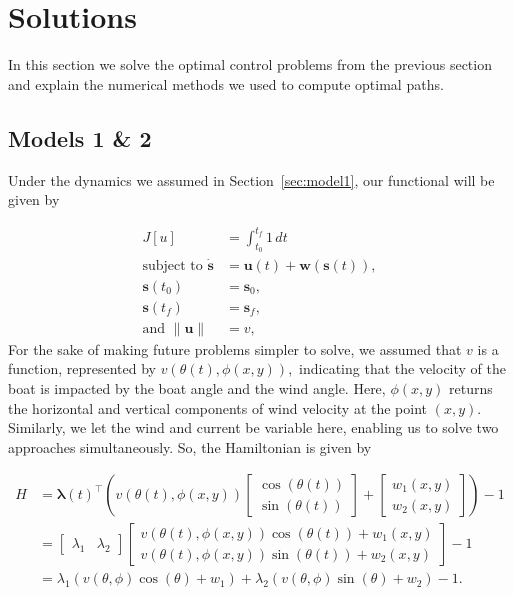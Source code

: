 \documentclass[11pt]{amsart}
\begin{document}
\section{Solutions}

\par In this section we solve the optimal control problems from the previous section and explain the numerical methods we used to compute optimal paths.

\subsection{Models 1 \& 2}

\par Under the dynamics we assumed in Section~\ref{sec:model1}, our functional will be given by

\begin{align*}
    J[u] &= \int_{t_0}^{t_f} 1 \,dt\\
    \text{subject to } \dot{\mathbf{s}} &= \mathbf{u}(t) + \mathbf{w}(\mathbf{s}(t)),\\
    \mathbf{s}(t_0) &= \mathbf{s}_0,\\
    \mathbf{s}(t_f) &= \mathbf{s}_f,\\
    \text{and } \| \mathbf{u} \| &= v,
\end{align*}
For the sake of making future problems simpler to solve, we assumed that $v$ is a function, represented by $v(\theta(t), \phi(x, y)),$ indicating that the velocity of the boat is impacted by the boat angle and the wind angle. Here, $\phi(x, y)$ returns the horizontal and vertical components of wind velocity at the point $(x, y).$ Similarly, we let the wind and current be variable here, enabling us to solve two approaches simultaneously. So, the Hamiltonian is given by 

\begin{align*}
    H &= \boldsymbol{\lambda}(t)^\top \left(v(\theta(t), \phi(x, y)) \begin{bmatrix} \cos(\theta(t)) \\ \sin(\theta(t)) \end{bmatrix} + \begin{bmatrix} w_1(x, y) \\ w_2(x, y) \end{bmatrix}\right) - 1\\
    &= \begin{bmatrix} \lambda_1 & \lambda_2 \end{bmatrix}  \begin{bmatrix} v(\theta(t), \phi(x, y)) \cos(\theta(t)) + w_1(x, y) \\ v(\theta(t), \phi(x, y)) \sin(\theta(t)) + w_2(x, y) \end{bmatrix} - 1 \\
    &= \lambda_1(v(\theta, \phi)\cos(\theta) + w_1)+ \lambda_2(v(\theta, \phi)\sin(\theta) + w_2) - 1.
\end{align*}
\end{document}
